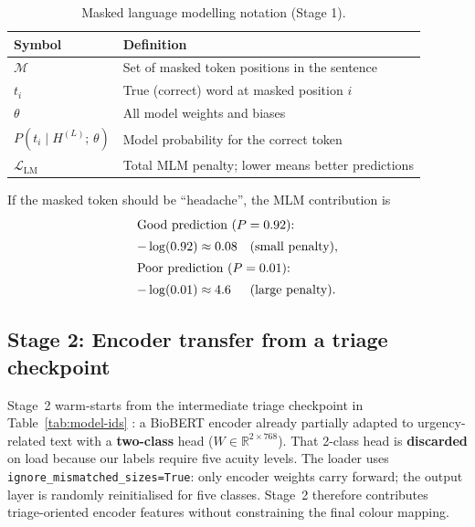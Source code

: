 \begin{table}[H]
\centering
\small
\begin{tabular}{|l|p{10cm}|}
\hline
\textbf{Symbol} & \textbf{Definition} \\
\hline
\(\mathcal{M}\) & Set of masked token positions in the sentence \\
\(t_i\) & True (correct) word at masked position \(i\) \\
\(\theta\) & All model weights and biases \\
\(P(t_i \mid H^{(L)};\,\theta)\) & Model probability for the correct token \\
\(\mathcal{L}_{\mathrm{LM}}\) & Total MLM penalty; lower means better predictions \\
\hline
\end{tabular}
\caption{Masked language modelling notation (Stage 1).}
\label{tab:mlm-symbols}
\end{table}

\begin{example}
If the masked token should be ``headache'', the MLM contribution is
\begin{align*}
  \shortintertext{Good prediction (\(P = 0.92\)):}
  -\log(0.92) &\approx 0.08 && \text{(small penalty)}, \\
  \shortintertext{Poor prediction (\(P = 0.01\)):}
  -\log(0.01) &\approx 4.6 && \text{(large penalty)}.
\end{align*}
\end{example}

\subsection{Stage 2: Encoder transfer from a triage checkpoint}
\label{sec:stage2}

Stage~2 warm-starts from the intermediate triage checkpoint in Table~\ref{tab:model-ids} \citep{yuvrajbioberttriage}: a BioBERT encoder already partially adapted to urgency-related text with a \textbf{two-class} head (\(W \in \mathbb{R}^{2 \times 768}\)). That 2-class head is \textbf{discarded} on load because our labels require five acuity levels. The loader uses \texttt{ignore\_mismatched\_sizes=True}: only encoder weights carry forward; the output layer is randomly reinitialised for five classes. Stage~2 therefore contributes triage-oriented encoder features without constraining the final colour mapping.


